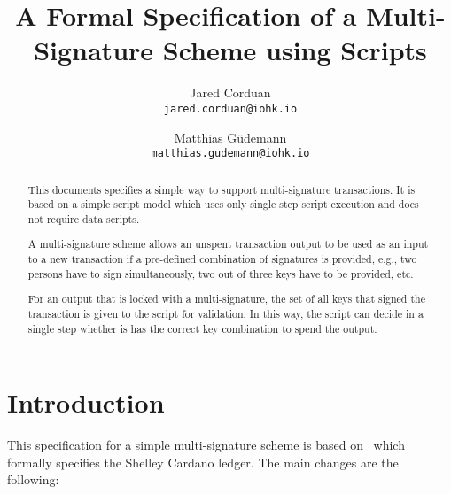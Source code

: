 \documentclass[11pt,a4paper,dvipsnames]{article}
\theoremstyle{definition}
\begin{document}

\title{A Formal Specification of a Multi-Signature Scheme using Scripts}

\author{Jared Corduan  \\ {\small \texttt{jared.corduan@iohk.io}} \\
   \and Matthias G\"udemann  \\ {\small \texttt{matthias.gudemann@iohk.io}}}


\maketitle

\begin{abstract}
  This documents specifies a simple way to support multi-signature
  transactions. It is based on a simple script model which uses only single step
  script execution and does not require data scripts.

  A multi-signature scheme allows an unspent transaction output to be used as an
  input to a new transaction if a pre-defined combination of signatures is
  provided, e.g., two persons have to sign simultaneously, two out of three
  keys have to be provided, etc.

  For an output that is locked with a multi-signature, the set of all keys that
  signed the transaction is given to the script for validation. In this way, the
  script can decide in a single step whether is has the correct key combination
  to spend the output.
\end{abstract}



\section{Introduction}
\label{sec:introduction}

This specification for a simple multi-signature scheme is based
on~\cite{shelley_formal_spec} which formally specifies the Shelley Cardano
ledger. The main changes are the following:
\end{document}
